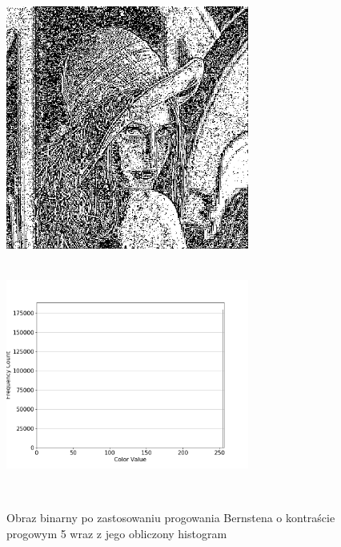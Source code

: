\documentclass[a4paper,12pt]{book}
\begin{document}
\begin{figure}[H]
	\caption{Obraz binarny po zastosowaniu progowania Bernstena o kontraście progowym 5 wraz z jego obliczony histogram}
	\includegraphics[width=8cm, height=8cm]{5-4/local-threshold-image-lena-5.png}
	\includegraphics[width=8cm, height=8cm]{5-4/local-threshold-lena-5.png}
	

\end{figure}
\end{document}
